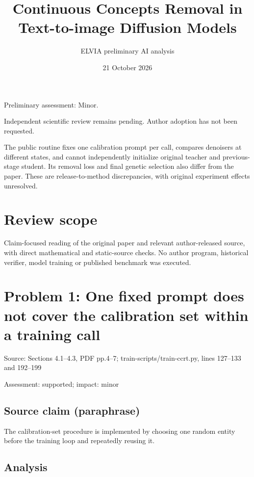 \documentclass[11pt]{article}
\begin{document}
\title{Continuous Concepts Removal in Text-to-image Diffusion Models}

\author{ELVIA preliminary AI analysis}\date{21 October 2026}\maketitle

Preliminary assessment: Minor.\par

Independent scientific review remains pending. Author adoption has not been requested.

The public routine fixes one calibration prompt per call, compares denoisers at different states, and cannot independently initialize original teacher and previous-stage student. Its removal loss and final genetic selection also differ from the paper. These are release-to-method discrepancies, with original experiment effects unresolved.

\section*{Review scope}

Claim-focused reading of the original paper and relevant author-released source, with direct mathematical and static-source checks. No author program, historical verifier, model training or published benchmark was executed.

\section*{Problem 1: One fixed prompt does not cover the calibration set within a training call}

Source: Sections 4.1–4.3, PDF pp.4–7; train-scripts/train-ccrt.py, lines 127–133 and 192–199

Assessment: supported; impact: minor

\subsection*{Source claim (paraphrase)}

The calibration-set procedure is implemented by choosing one random entity before the training loop and repeatedly reusing it.

\subsection*{Analysis}
\end{document}
